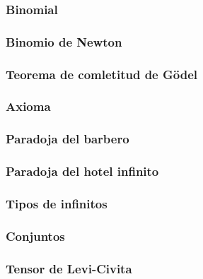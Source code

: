 \documentclass{article}
\begin{document}
\subsubsection{Binomial}


\subsubsection{Binomio de Newton}


\subsubsection{Teorema de comletitud de Gödel}


\subsubsection{Axioma}


\subsubsection{Paradoja del barbero}


\subsubsection{Paradoja del hotel infinito}


\subsubsection{Tipos de infinitos}


\subsubsection{Conjuntos}


\subsubsection{Tensor de Levi-Civita}
  \clearpage
\end{document}
